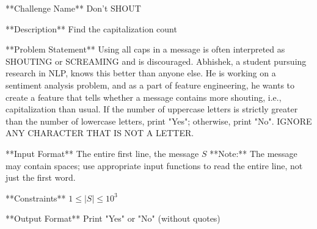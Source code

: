 **Challenge Name**  
Don't SHOUT

**Description**  
Find the capitalization count

**Problem Statement**  
Using all caps in a message is often interpreted as SHOUTING or SCREAMING and is discouraged. Abhishek, a student pursuing research in NLP, knows this better than anyone else. He is working on a sentiment analysis problem, and as a part of feature engineering, he wants to create a feature that tells whether a message contains more shouting, i.e., capitalization than usual. If the number of uppercase letters is strictly greater than the number of lowercase letters, print "Yes"; otherwise, print "No". IGNORE ANY CHARACTER THAT IS NOT A LETTER.

**Input Format**  
The entire first line, the message $S$  
**Note:** The message may contain spaces; use appropriate input functions to read the entire line, not just the first word.

**Constraints**  
$1 \leq |S| \leq 10^3$

**Output Format**  
Print "Yes" or "No" (without quotes)
